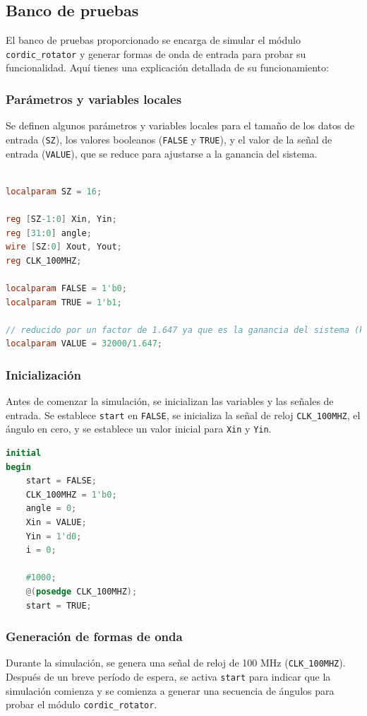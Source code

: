\documentclass[12pt,a4paper, twoside]{article} %
\begin{document}
\subsection{Banco de pruebas}

El banco de pruebas proporcionado se encarga de simular el módulo \texttt{cordic\_rotator} y generar formas de onda de entrada para probar su funcionalidad. Aquí tienes una explicación detallada de su funcionamiento:

\subsubsection{Parámetros y variables locales}
Se definen algunos parámetros y variables locales para el tamaño de los datos de entrada (\texttt{SZ}), los valores booleanos (\texttt{FALSE} y \texttt{TRUE}), y el valor de la señal de entrada (\texttt{VALUE}), que se reduce para ajustarse a la ganancia del sistema.

\begin{lstlisting}[language=Verilog]

localparam SZ = 16; 

reg [SZ-1:0] Xin, Yin;
reg [31:0] angle;
wire [SZ:0] Xout, Yout;
reg CLK_100MHZ;

localparam FALSE = 1'b0;
localparam TRUE = 1'b1;

// reducido por un factor de 1.647 ya que es la ganancia del sistema (k)
localparam VALUE = 32000/1.647; 

\end{lstlisting}

\subsubsection{Inicialización}
Antes de comenzar la simulación, se inicializan las variables y las señales de entrada. Se establece \texttt{start} en \texttt{FALSE}, se inicializa la señal de reloj \texttt{CLK\_100MHZ}, el ángulo en cero, y se establece un valor inicial para \texttt{Xin} y \texttt{Yin}.

\begin{lstlisting}[language=Verilog]
initial
begin
    start = FALSE;
    CLK_100MHZ = 1'b0;
    angle = 0;
    Xin = VALUE;
    Yin = 1'd0;
    i = 0;
  
    #1000;
    @(posedge CLK_100MHZ);
    start = TRUE;
\end{lstlisting}

\subsubsection{Generación de formas de onda}
Durante la simulación, se genera una señal de reloj de 100 MHz (\texttt{CLK\_100MHZ}). Después de un breve período de espera, se activa \texttt{start} para indicar que la simulación comienza y se comienza a generar una secuencia de ángulos para probar el módulo \texttt{cordic\_rotator}.
\end{document}
